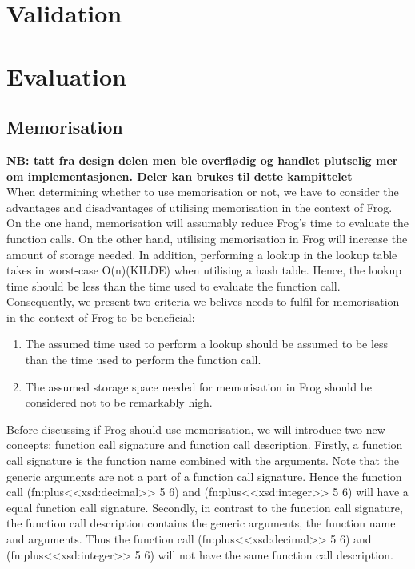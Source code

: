 \section{Validation}

\section{Evaluation}
\label{implementation_evaluation}

\subsection{Memorisation}
\textbf{NB: tatt fra design delen men ble overflødig og handlet plutselig mer om implementasjonen. Deler kan brukes til dette kampittelet}
\\
When determining whether to use memorisation or not, we have to consider the advantages and disadvantages of utilising memorisation in the context of Frog. On the one hand, memorisation will assumably reduce Frog's time to evaluate the function calls. On the other hand, utilising memorisation in Frog will increase the amount of storage needed. In addition, performing a lookup in the lookup table takes in worst-case O(n)(KILDE) when utilising a hash table. Hence, the lookup time should be less than the time used to evaluate the function call. Consequently, we present two criteria we belives needs to fulfil for memorisation in the context of Frog to be beneficial:
\begin{enumerate}
    \item The assumed time used to perform a lookup should be assumed to be less than the time used to perform the function call.
    \item The assumed storage space needed for memorisation in Frog should be considered not to be remarkably high. 
\end{enumerate}

\para 
Before discussing if Frog should use memorisation, we will introduce two new concepts: function call signature and function call description. 
Firstly, a function call signature is the function name combined with the arguments. Note that the generic arguments are not a part of a function call signature. Hence the function call (fn:plus<<xsd:decimal>> 5 6) and (fn:plus<<xsd:integer>> 5 6) will have a equal function call signature. Secondly, in contrast to the function call signature, the function call description contains the generic arguments, the function name and arguments. Thus the function call (fn:plus<<xsd:decimal>> 5 6) and (fn:plus<<xsd:integer>> 5 6) will not have the same function call description.

